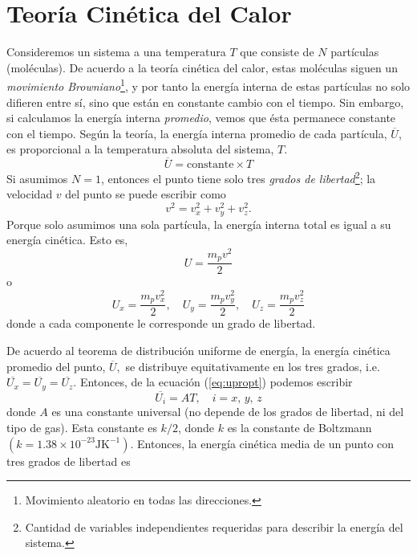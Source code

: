 \documentclass[openany]{book}
\begin{document}
\section{Teoría Cinética del Calor}
Consideremos un sistema a una temperatura $T$ que consiste de $N$ partículas (moléculas). De acuerdo a la teoría cinética del calor, estas moléculas siguen un \emph{movimiento Browniano}\footnote{Movimiento aleatorio en todas las direcciones.}, y por tanto la energía interna de estas partículas no solo difieren entre sí, sino que están en constante cambio con el tiempo. Sin embargo, si calculamos la energía interna \emph{promedio}, vemos que ésta permanece constante con el tiempo. Según la teoría, la energía interna promedio de cada partícula, $\overline{U}$, es proporcional a la temperatura absoluta del sistema, $T$.
\begin{equation}\label{eq:upropt}
	\overline{U}=\mathrm{constante}\times T
\end{equation}
Si asumimos $N\!=\!1$, entonces el punto tiene solo tres \emph{grados de libertad}\footnote{Cantidad de variables independientes requeridas para describir la energía del sistema.}; la velocidad $v$ del punto se puede escribir como
\begin{equation*}
	v^2=v_x^2+v_y^2+v_z^2.
\end{equation*}
Porque solo asumimos una sola partícula, la energía interna total es igual a su energía cinética. Esto es,
\begin{equation*}
	U=\frac{m_p v^2}{2}
\end{equation*}
o
\begin{equation*}
	U_x=\frac{m_p v_x^2}{2},\quad U_y=\frac{m_p v_y^2}{2},\quad U_z=\frac{m_p v_z^2}{2}
\end{equation*}
donde a cada componente le corresponde un grado de libertad.\par De acuerdo al teorema de distribución uniforme de energía, la energía cinética promedio del punto, $ \overline{U}, $ se distribuye equitativamente en los tres grados, i.e. $ \overline{U_x}=\overline{U_y}=\overline{U_z}. $ Entonces, de la ecuación (\ref{eq:upropt}) podemos escribir
\begin{equation*}
	\overline{U_i}=AT,\quad i=x,\,y,\,z
\end{equation*}
donde $A$ es una constante universal (no depende de los grados de libertad, ni del tipo de gas). Esta constante es $k/2$, donde $k$ es la constante de Boltzmann $(k=1.38\times10^{-23}\mathrm{J K}^{-1})$. Entonces, la energía cinética media de un punto con tres grados de libertad es
\end{document}
